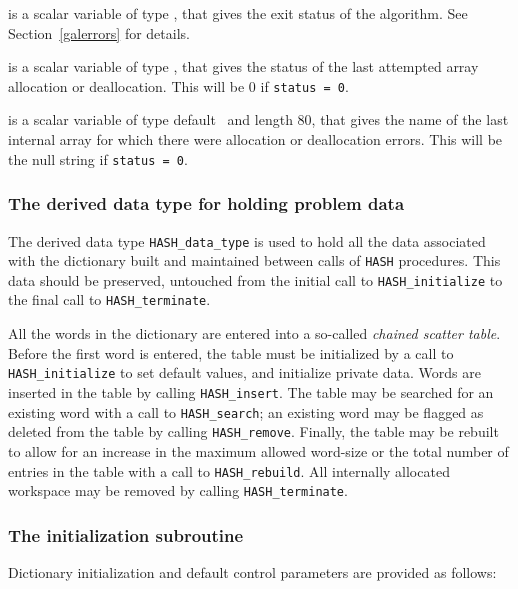 \documentclass{galahad}
\newcommand{\packagename}{HASH}
\begin{document}
\begin{description}
 is a scalar variable of type \integer, that gives the
exit status of the algorithm.
See Section~\ref{galerrors} for details.

 is a scalar variable of type \integer, that gives
the status of the last attempted array allocation or deallocation.
This will be 0 if {\tt status = 0}.

 is a scalar variable of type default \character\
and length 80, that  gives the name of the last internal array
for which there were allocation or deallocation errors.
This will be the null string if {\tt status = 0}.

\end{description}


\subsubsection{The derived data type for holding problem data}\label{typedata}
The derived data type
{\tt \packagename\_data\_type}
is used to hold all the data associated with the dictionary built
and maintained between calls of {\tt \packagename} procedures.
This data should be preserved, untouched 
from the initial call to
{\tt \packagename\_initialize}
to the final call to
{\tt \packagename\_terminate}.


\galarguments
All the words in the dictionary are entered into a so-called
{\em chained scatter table}. Before the first word is entered, the
table must be initialized by a call to {\tt \packagename\_initialize}
to set default values, and initialize private data.
Words are inserted in the table by calling {\tt \packagename\_insert}. 
The table may be searched for an existing word with a call to 
{\tt \packagename\_search}; an existing word may be flagged as deleted
from the table by calling {\tt \packagename\_remove}. 
Finally, the table may be rebuilt to
allow for an increase in the maximum allowed word-size or the total
number of entries in the table with a call to {\tt \packagename\_rebuild}.
All internally allocated workspace may be removed by calling
{\tt \packagename\_terminate}.


\subsubsection{The initialization subroutine}\label{subinit}
Dictionary initialization and default control parameters 
are provided as follows:
\vspace*{1mm}
\end{document}

